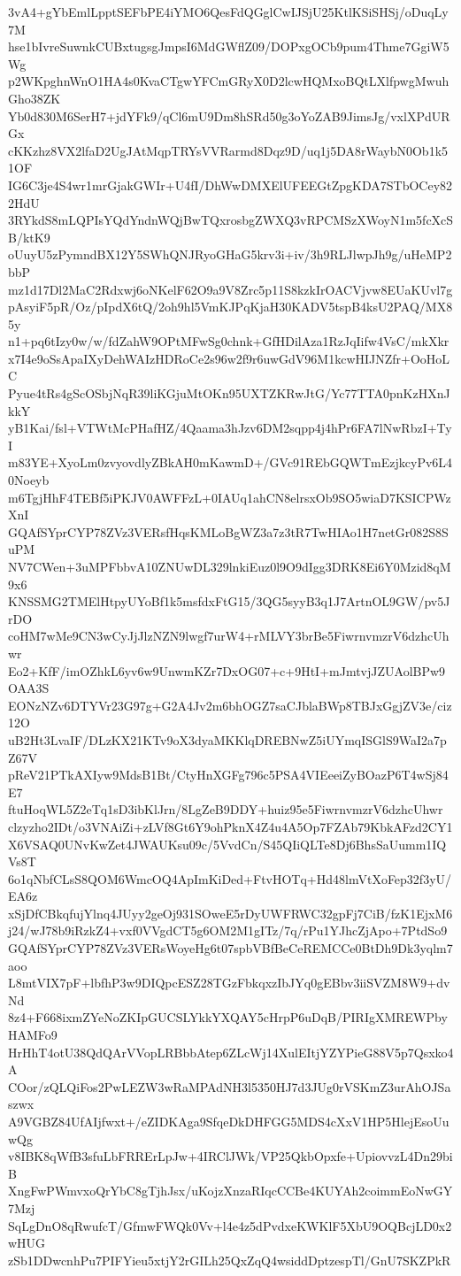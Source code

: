 3vA4+gYbEmlLpptSEFbPE4iYMO6QesFdQGglCwIJSjU25KtlKSiSHSj/oDuqLy7M
hse1bIvreSuwnkCUBxtugsgJmpsI6MdGWflZ09/DOPxgOCb9pum4Thme7GgiW5Wg
p2WKpghnWnO1HA4s0KvaCTgwYFCmGRyX0D2lcwHQMxoBQtLXlfpwgMwuhGho38ZK
Yb0d830M6SerH7+jdYFk9/qCl6mU9Dm8hSRd50g3oYoZAB9JimsJg/vxlXPdURGx
cKKzhz8VX2lfaD2UgJAtMqpTRYsVVRarmd8Dqz9D/uq1j5DA8rWaybN0Ob1k51OF
IG6C3je4S4wr1mrGjakGWIr+U4fI/DhWwDMXElUFEEGtZpgKDA7STbOCey822HdU
3RYkdS8mLQPIsYQdYndnWQjBwTQxrosbgZWXQ3vRPCMSzXWoyN1m5fcXcSB/ktK9
oUuyU5zPymndBX12Y5SWhQNJRyoGHaG5krv3i+iv/3h9RLJlwpJh9g/uHeMP2bbP
mz1d17Dl2MaC2Rdxwj6oNKelF62O9a9V8Zrc5p11S8kzkIrOACVjvw8EUaKUvl7g
pAsyiF5pR/Oz/pIpdX6tQ/2oh9hl5VmKJPqKjaH30KADV5tspB4ksU2PAQ/MX85y
n1+pq6tIzy0w/w/fdZahW9OPtMFwSg0chnk+GfHDilAza1RzJqIifw4VsC/mkXkr
x7I4e9oSsApaIXyDehWAIzHDRoCe2s96w2f9r6uwGdV96M1kcwHIJNZfr+OoHoLC
Pyue4tRs4gScOSbjNqR39liKGjuMtOKn95UXTZKRwJtG/Yc77TTA0pnKzHXnJkkY
yB1Kai/fsl+VTWtMcPHafHZ/4Qaama3hJzv6DM2sqpp4j4hPr6FA7lNwRbzI+TyI
m83YE+XyoLm0zvyovdlyZBkAH0mKawmD+/GVc91REbGQWTmEzjkcyPv6L40Noeyb
m6TgjHhF4TEBf5iPKJV0AWFFzL+0IAUq1ahCN8elrsxOb9SO5wiaD7KSICPWzXnI
GQAfSYprCYP78ZVz3VERsfHqsKMLoBgWZ3a7z3tR7TwHIAo1H7netGr082S8SuPM
NV7CWen+3uMPFbbvA10ZNUwDL329lnkiEuz0l9O9dIgg3DRK8Ei6Y0Mzid8qM9x6
KNSSMG2TMElHtpyUYoBf1k5msfdxFtG15/3QG5syyB3q1J7ArtnOL9GW/pv5JrDO
coHM7wMe9CN3wCyJjJlzNZN9lwgf7urW4+rMLVY3brBe5FiwrnvmzrV6dzhcUhwr
Eo2+KfF/imOZhkL6yv6w9UnwmKZr7DxOG07+c+9HtI+mJmtvjJZUAolBPw9OAA3S
EONzNZv6DTYVr23G97g+G2A4Jv2m6bhOGZ7saCJblaBWp8TBJxGgjZV3e/ciz12O
uB2Ht3LvaIF/DLzKX21KTv9oX3dyaMKKlqDREBNwZ5iUYmqISGlS9WaI2a7pZ67V
pReV21PTkAXIyw9MdsB1Bt/CtyHnXGFg796c5PSA4VIEeeiZyBOazP6T4wSj84E7
ftuHoqWL5Z2eTq1sD3ibKlJrn/8LgZeB9DDY+huiz95e5FiwrnvmzrV6dzhcUhwr
clzyzho2IDt/o3VNAiZi+zLVf8Gt6Y9ohPknX4Z4u4A5Op7FZAb79KbkAFzd2CY1
X6VSAQ0UNvKwZet4JWAUKsu09c/5VvdCn/S45QIiQLTe8Dj6BhsSaUumm1IQVs8T
6o1qNbfCLsS8QOM6WmcOQ4ApImKiDed+FtvHOTq+Hd48lmVtXoFep32f3yU/EA6z
xSjDfCBkqfujYlnq4JUyy2geOj931SOweE5rDyUWFRWC32gpFj7CiB/fzK1EjxM6
j24/wJ78b9iRzkZ4+vxf0VVgdCT5g6OM2M1gITz/7q/rPu1YJhcZjApo+7PtdSo9
GQAfSYprCYP78ZVz3VERsWoyeHg6t07spbVBfBeCeREMCCe0BtDh9Dk3yqlm7aoo
L8mtVIX7pF+lbfhP3w9DIQpcESZ28TGzFbkqxzIbJYq0gEBbv3iiSVZM8W9+dvNd
8z4+F668ixmZYeNoZKIpGUCSLYkkYXQAY5cHrpP6uDqB/PIRIgXMREWPbyHAMFo9
HrHhT4otU38QdQArVVopLRBbbAtep6ZLcWj14XulEItjYZYPieG88V5p7Qsxko4A
COor/zQLQiFos2PwLEZW3wRaMPAdNH3l5350HJ7d3JUg0rVSKmZ3urAhOJSaszwx
A9VGBZ84UfAIjfwxt+/eZIDKAga9SfqeDkDHFGG5MDS4cXxV1HP5HlejEsoUuwQg
v8IBK8qWfB3sfuLbFRRErLpJw+4IRClJWk/VP25QkbOpxfe+UpiovvzL4Dn29biB
XngFwPWmvxoQrYbC8gTjhJsx/uKojzXnzaRIqcCCBe4KUYAh2coimmEoNwGY7Mzj
SqLgDnO8qRwufcT/GfmwFWQk0Vv+l4e4z5dPvdxeKWKlF5XbU9OQBcjLD0x2wHUG
zSb1DDwcnhPu7PIFYieu5xtjY2rGILh25QxZqQ4wsiddDptzespTl/GnU7SKZPkR
